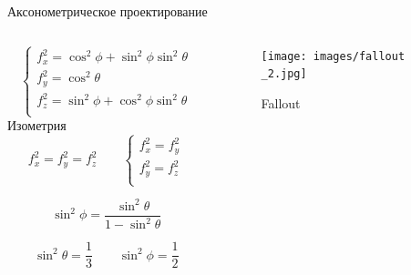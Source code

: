 \documentclass{beamer}
\begin{document}
	\begin{frame}{Аксонометрическое проектирование}

		\begin{columns}
			\begin{column}{0.45\textwidth}
		\[
			\begin{cases}
				f_x^2 = \cos^2 \phi + \sin^2 \phi \sin^2 \theta \\
				f_y^2 = \cos^2 \theta \\
				f_z^2 = \sin^2 \phi + \cos^2 \phi \sin^2 \theta \\
			\end{cases}	
		\]
		Изометрия
		\[
			f_x^2 = f_y^2 = f_z^2
			\qquad
			\begin{cases}
				f_x^2 = f_y^2  \\
				f_y^2 = f_z^2 \\
			\end{cases}	
		\]

		\[
			\sin^2 \phi  = \frac{\sin^2 \theta}{1 - \sin^2 \theta}
		\]


		\[
			\sin^2 \theta  = \frac{1}{3}
			\qquad
			\sin^2 \phi  = \frac{1}{2}
		\]

	\end{column}
	\begin{column}{0.55\textwidth}
		\begin{figure} 
				\texttt{[image: images/fallout\\\_2.jpg]}
			\caption{Fallout}
		\end{figure}
	\end{column}
\end{columns}

	\end{frame}
\end{document}
